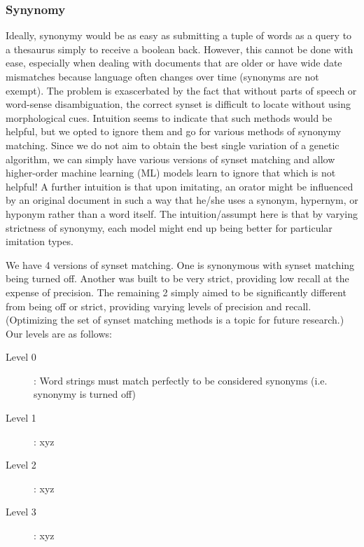 \subsubsection{Synynomy}
Ideally, synonymy would be as easy as submitting a tuple of words as a query to a thesaurus simply to receive a boolean back. However, this cannot be done with ease, especially when dealing with documents that are older or have wide date mismatches because language often changes over time (synonyms are not exempt). The problem is exascerbated by the fact that without parts of speech or word-sense disambiguation, the correct synset is difficult to locate without using morphological cues. Intuition seems to indicate that such methods would be helpful, but we opted to ignore them and go for various methods of synonymy matching. Since we do not aim to obtain the best single variation of a genetic algorithm, we can simply have various versions of synset matching and allow higher-order machine learning (ML) models learn to ignore that which is not helpful! A further intuition is that upon imitating, an orator might be influenced by an original document in such a way that he/she uses a synonym, hypernym, or hyponym rather than a word itself. The intuition/assumpt here is that by varying strictness of synonymy, each model might end up being better for particular imitation types.

We have 4 versions of synset matching. One is synonymous with synset matching being turned off. Another was built to be very strict, providing low recall at the expense of precision. The remaining 2 simply aimed to be significantly different from being off or strict, providing varying levels of precision and recall. (Optimizing the set of synset matching methods is a topic for future research.) Our levels are as follows:

\begin{description}
	\item [Level 0]: Word strings must match perfectly to be considered synonyms (i.e. synonymy is turned off)
	\item [Level 1]: xyz
	\item [Level 2]: xyz
	\item [Level 3]: xyz
\end{description}


